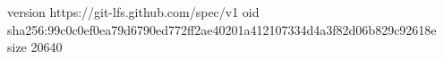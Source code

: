 version https://git-lfs.github.com/spec/v1
oid sha256:99c0c0ef0ea79d6790ed772ff2ae40201a412107334d4a3f82d06b829c92618e
size 20640
